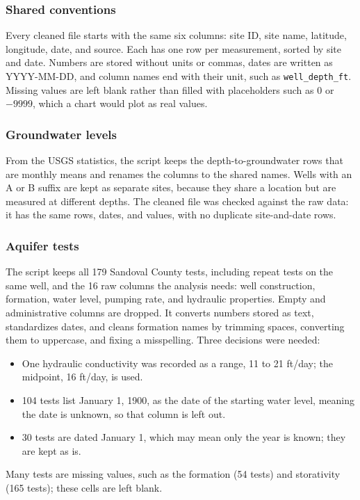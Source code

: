 \documentclass[10pt,twocolumn,letterpaper]{article}
\begin{document}
\subsubsection{Shared conventions}
Every cleaned file starts with the same six columns: site ID, site name, latitude, longitude,
date, and source. Each has one row per measurement, sorted by site and date. Numbers are stored
without units or commas, dates are written as YYYY-MM-DD, and column names end with their unit,
such as \texttt{well\_depth\_ft}. Missing values are left blank rather than filled with
placeholders such as 0 or $-9999$, which a chart would plot as real values.

\subsubsection{Groundwater levels}
From the USGS statistics, the script keeps the depth-to-groundwater rows that are monthly means
and renames the columns to the shared names. Wells with an A or B suffix are kept as separate
sites, because they share a location but are measured at different depths. The cleaned file was
checked against the raw data: it has the same rows, dates, and values, with no duplicate
site-and-date rows.

\subsubsection{Aquifer tests}
The script keeps all 179 Sandoval County tests, including repeat tests on the same well, and the
16 raw columns the analysis needs: well construction, formation, water level, pumping rate, and
hydraulic properties. Empty and administrative columns are dropped. It converts numbers stored as
text, standardizes dates, and cleans formation names by trimming spaces, converting them to
uppercase, and fixing a misspelling. Three decisions were needed:
\begin{itemize}
  \item One hydraulic conductivity was recorded as a range, 11 to 21 ft/day; the midpoint,
        16 ft/day, is used.
  \item 104 tests list January 1, 1900, as the date of the starting water level, meaning the
        date is unknown, so that column is left out.
  \item 30 tests are dated January 1, which may mean only the year is known; they are kept as is.
\end{itemize}
Many tests are missing values, such as the formation (54 tests) and storativity (165 tests); these
cells are left blank.
\end{document}
